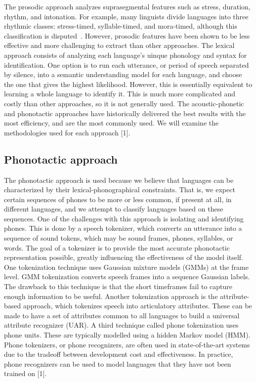 \documentclass{llncs}
\begin{document}
The prosodic approach analyzes suprasegmental features such as stress, duration, rhythm, and intonation. For example, many linguists divide languages into three rhythmic classes: stress-timed, syllable-timed, and mora-timed, although this classification is disputed~\cite{arvanti}. However, prosodic features have been shown to be less effective and more challenging to extract than other approaches. The lexical approach consists of analyzing each language's uinque phonology and syntax for identification. One option is to run each utterance, or period of speech separated by silence, into a semantic understanding model for each language, and choose the one that gives the highest likelihood. However, this is essentially equivalent to learning a whole language to identify it. This is much more complicated and costly than other approaches, so it is not generally used. The acoustic-phonetic and phonotactic approaches have historically delivered the best results with the most efficiency, and are the most commonly used. We will examine the methodologies used for each approach [1].

\subsection{Phonotactic approach}
The phonotactic approach is used because we believe that languages can be characterized by their lexical-phonographical constraints. That is, we expect certain sequences of phones to be more or less common, if present at all, in different languages, and we attempt to classify languages based on these sequences. One of the challenges with this approach is isolating and identifying phones. This is done by a speech tokenizer, which converts an utterance into a sequence of sound tokens, which may be sound frames, phones, syllables, or words. The goal of a tokenizer is to provide the most accurate phonotactic representation possible, greatly influencing the effectiveness of the model itself. One tokenization technique uses Gaussian mixture models (GMMs) at the frame level. GMM tokenization converts speech frames into a sequence Gaussian labels. The drawback to this technique is that the short timeframes fail to capture enough information to be useful. Another tokenization approach is the attribute-based approach, which tokenizes speech into articulatory attributes. These can be made to have a set of attributes common to all languages to build a universal attribute recognizer (UAR). A third technique called phone tokenization uses phone units. These are typically modelled using a hidden Markov model (HMM). Phone tokenizers, or phone recognizers, are often used in state-of-the-art systems due to the tradeoff between development cost and effectiveness. In practice, phone recognizers can be used to model languages that they have not been trained on [1].
\end{document}
